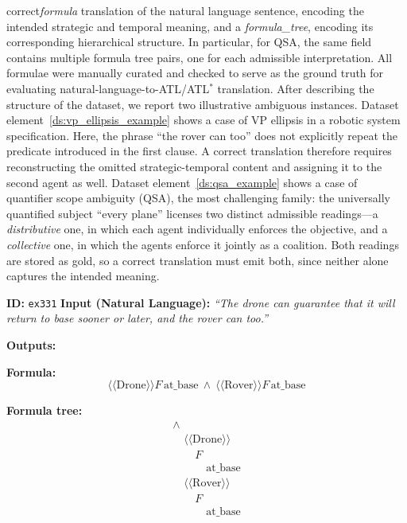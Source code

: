 correct\textit{formula} translation of the natural language sentence, encoding the intended strategic and temporal meaning, and a \textit{formula\_tree}, encoding its corresponding hierarchical structure. In particular, for QSA, the same field contains multiple formula tree pairs, one for each admissible interpretation. All formulae were manually curated and checked to serve as the ground truth for evaluating natural-language-to-ATL/ATL$^\ast$ translation. After describing the structure of the dataset, we report two illustrative ambiguous instances. Dataset element~\ref{ds:vp_ellipsis_example} shows a case of VP ellipsis in a robotic system specification. Here, the phrase ``the rover can too'' does not explicitly repeat the predicate introduced in the first clause. A correct translation therefore requires reconstructing the omitted strategic-temporal content and assigning it to the second agent as well. Dataset element~\ref{ds:qsa_example} shows a case of quantifier scope ambiguity (QSA), the most challenging family: the universally quantified subject ``every plane'' licenses two distinct admissible readings---a \emph{distributive} one, in which each agent individually enforces the objective, and a \emph{collective} one, in which the agents enforce it jointly as a coalition. Both readings are stored as gold, so a correct translation must emit both, since neither alone captures the intended meaning.

\begin{dataset}[t]
\caption{VP ellipsis ambiguity example}
\label{ds:vp_ellipsis_example}
\begin{algorithmic}[1]
\STATE \textbf{ID:} \texttt{ex331}
\STATE \textbf{Input (Natural Language):}
\STATE \quad \textit{``The drone can guarantee that it will return to base sooner or later, and the rover can too.''}

\STATE \textbf{Outputs:}
\STATE \quad
\begin{minipage}[t]{0.92\linewidth}
\textbf{Formula:}
\[
\langle\!\langle \text{Drone} \rangle\!\rangle
F\,\text{at\_base}
\ \wedge\
\langle\!\langle \text{Rover} \rangle\!\rangle
F\,\text{at\_base}
\]
\end{minipage}

\STATE \quad
\begin{minipage}[t]{0.92\linewidth}
\textbf{Formula tree:}
\[
\begin{array}{l}
\wedge
\\
\quad \langle\!\langle \text{Drone} \rangle\!\rangle
\\
\quad\quad F
\\
\quad\quad\quad \text{at\_base}
\\[1mm]
\quad \langle\!\langle \text{Rover} \rangle\!\rangle
\\
\quad\quad F
\\
\quad\quad\quad \text{at\_base}
\end{array}
\]
\end{minipage}
\end{algorithmic}
\end{dataset}

